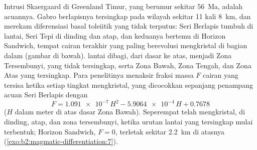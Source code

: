 Intrusi Skaergaard di Greenland Timur, yang berumur sekitar \qty{56}{Ma}, adalah
acuannya. Gabro berlapisnya tersingkap pada wilayah sekitar 11 kali \qty{8}{km}, dan merekam
diferensiasi basal toleiitik yang tidak terputus: Seri Berlapis tumbuh di
lantai, Seri Tepi di dinding dan atap, dan keduanya bertemu di Horizon Sandwich,
tempat cairan terakhir yang paling berevolusi mengkristal di bagian dalam (gambar di bawah).
 lantai dibagi, dari dasar ke atas, menjadi Zona Tersembunyi, yang tidak tersingkap,
serta Zona Bawah, Zona Tengah, dan Zona Atas yang tersingkap. Para
penelitinya menaksir fraksi massa $F$ cairan yang tersisa ketika setiap tingkat mengkristal, yang dicocokkan
sepanjang penampang acuan Seri Berlapis dengan
\[
F = \num{1.091e-7}\,H^2 - \num{5.9064e-4}\,H + 0.7678
\]
($H$ dalam meter di atas dasar Zona Bawah). Seperempat  telah
mengkristal, di dinding, atap, dan zona tersembunyi, ketika urutan lantai yang tersingkap
mulai terbentuk; Horizon Sandwich, $F = 0$, terletak sekitar \qty{2.2}{km} di atasnya
(\cref{exo:b2:magmatic-differentiation:7}).

